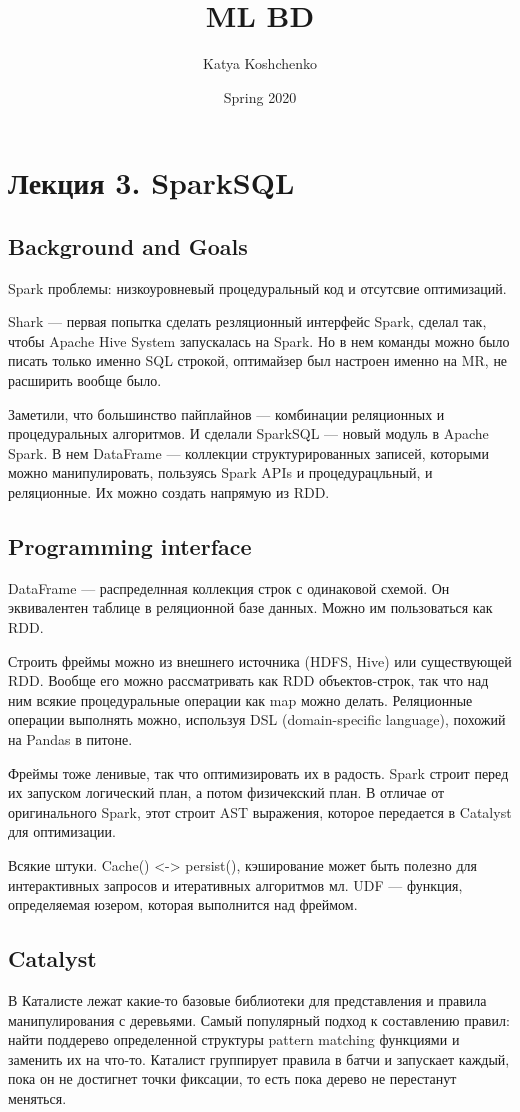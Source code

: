 \documentclass[12pt]{article}
\title{ML BD}
\date{Spring 2020}
\begin{document}
\author{Katya Koshchenko}
\maketitle

\section{Лекция 3. SparkSQL}

\subsection{Background and Goals}

Spark проблемы: низкоуровневый процедуральный код и отсутсвие оптимизаций. 

Shark --- первая попытка сделать резляционный интерфейс Spark, сделал так, чтобы Apache Hive System запускалась на Spark. Но в нем команды можно было писать только именно SQL строкой, оптимайзер был настроен именно на MR, не расширить вообще было. 

Заметили, что большинство пайплайнов --- комбинации реляционных и процедуральных алгоритмов. И сделали SparkSQL --- новый модуль в Apache Spark. В нем DataFrame --- коллекции структурированных записей, которыми можно манипулировать, пользуясь Spark APIs и процедурацльный, и реляционные. Их можно создать напрямую из RDD.

\subsection{Programming interface}

DataFrame --- распределнная коллекция строк с одинаковой схемой. Он эквивалентен таблице в реляционной базе данных. Можно им пользоваться как RDD.

Строить фреймы можно из внешнего источника (HDFS, Hive) или существующей RDD. Вообще его можно рассматривать как RDD объектов-строк, так что над ним всякие процедуральные операции как map можно делать. Реляционные операции выполнять можно, используя DSL (domain-specific language), похожий на Pandas в питоне.

Фреймы тоже ленивые, так что оптимизировать их в радость. Spark строит перед их запуском логический план, а потом физичекский план. В отличае от оригинального Spark, этот строит AST выражения, которое передается в Catalyst для оптимизации.

Всякие штуки. Cache() <-> persist(), кэширование может быть полезно для интерактивных запросов и итеративных алгоритмов мл. UDF --- функция, определяемая юзером, которая выполнится над фреймом. 

\subsection{Catalyst}

В Каталисте лежат какие-то базовые библиотеки для представления и правила манипулирования с деревьями. Самый популярный подход к составлению правил: найти поддерево определенной структуры pattern matching функциями и заменить их на что-то. Каталист группирует правила в батчи и запускает каждый, пока он не достигнет точки фиксации, то есть пока дерево не перестанут меняться.
\end{document}
